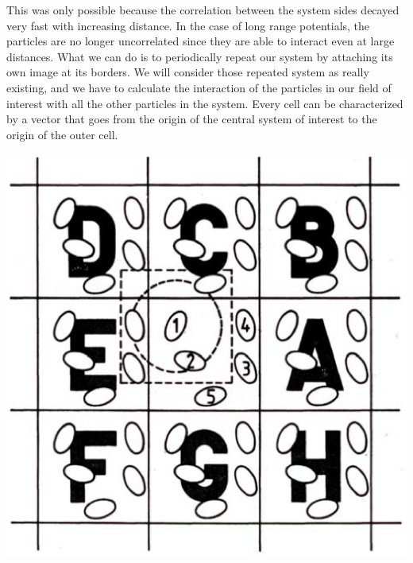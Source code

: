 \noindent
\begin{minipage}{\textwidth}
\begin{minipage}{.48\textwidth}
This was only possible because the correlation between the system sides decayed very fast with increasing distance. In the case of long range potentials, the particles are no longer uncorrelated since they are able to interact even at large distances. What we can do is to periodically repeat our system by attaching its own image at its borders. We will consider those repeated system as really existing, and we have to calculate the interaction of the particles in our field of interest with all the other particles in the system. Every cell can be characterized by a vector that goes from the origin of the central system of interest to the origin of the outer cell.
 \end{minipage}\hfill
\begin{minipage}{.48\textwidth}
  \centering
  \includegraphics[width=.9\textwidth]{pics/ewald}
  \label{fig:ewald}
\end{minipage}
\end{minipage}
\vspace{0.1cm}

